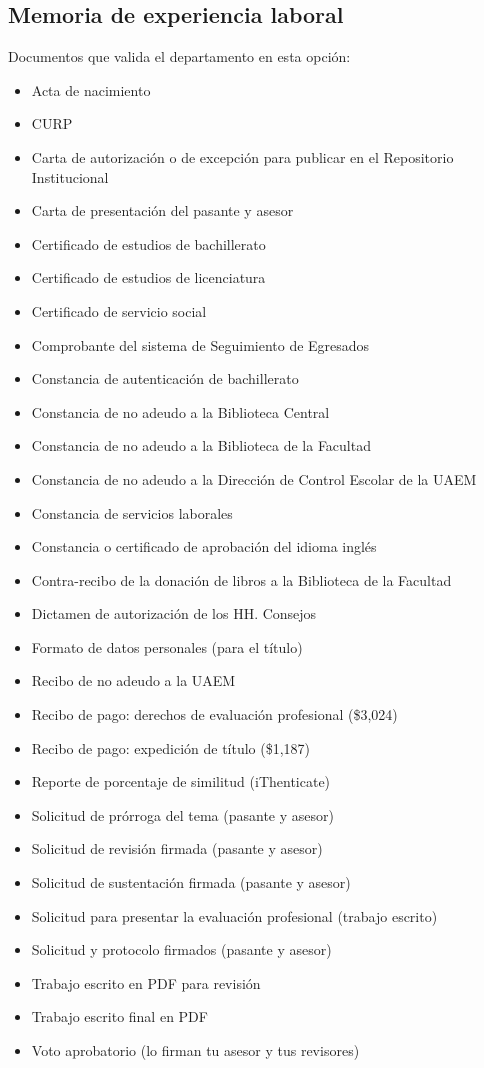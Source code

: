 \subsection{Memoria de experiencia laboral}
Documentos que valida el departamento en esta opción:
\begin{itemize}
  \item Acta de nacimiento
  \item CURP
  \item Carta de autorización o de excepción para publicar en el Repositorio Institucional
  \item Carta de presentación del pasante y asesor
  \item Certificado de estudios de bachillerato
  \item Certificado de estudios de licenciatura
  \item Certificado de servicio social
  \item Comprobante del sistema de Seguimiento de Egresados
  \item Constancia de autenticación de bachillerato
  \item Constancia de no adeudo a la Biblioteca Central
  \item Constancia de no adeudo a la Biblioteca de la Facultad
  \item Constancia de no adeudo a la Dirección de Control Escolar de la UAEM
  \item Constancia de servicios laborales
  \item Constancia o certificado de aprobación del idioma inglés
  \item Contra-recibo de la donación de libros a la Biblioteca de la Facultad
  \item Dictamen de autorización de los HH. Consejos
  \item Formato de datos personales (para el título)
  \item Recibo de no adeudo a la UAEM
  \item Recibo de pago: derechos de evaluación profesional (\$3,024)
  \item Recibo de pago: expedición de título (\$1,187)
  \item Reporte de porcentaje de similitud (iThenticate)
  \item Solicitud de prórroga del tema (pasante y asesor)
  \item Solicitud de revisión firmada (pasante y asesor)
  \item Solicitud de sustentación firmada (pasante y asesor)
  \item Solicitud para presentar la evaluación profesional (trabajo escrito)
  \item Solicitud y protocolo firmados (pasante y asesor)
  \item Trabajo escrito en PDF para revisión
  \item Trabajo escrito final en PDF
  \item Voto aprobatorio (lo firman tu asesor y tus revisores)
\end{itemize}
